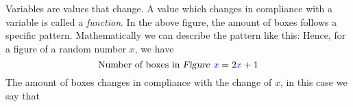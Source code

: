 





\newpage
\section{\fintro}
Variables are values that change. A value which changes in compliance with a variable is called a \textit{function}.\vsk
{}
In the above figure, the amount of boxes follows a specific pattern. Mathematically we can describe the pattern like this:
Hence, for a figure of a random number $ x $, we have
\[ \text{Number of boxes in \textsl{Figure }}{\color{blue}x}=2{\color{blue}x}+1 \]
The amount of boxes changes in compliance with the change of $ x $, in this case we say that\regv
\st{}\regv

